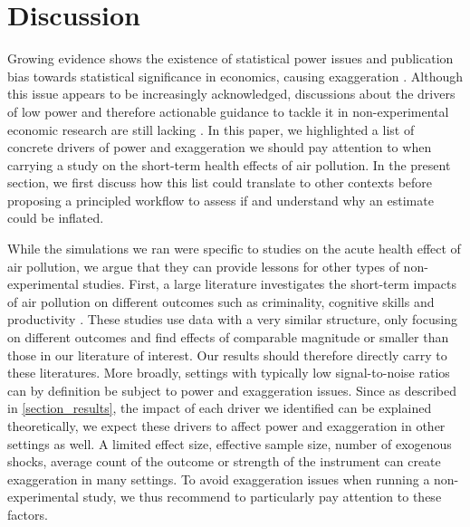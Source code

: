 \documentclass[12pt]{article}
\begin{document}

\section{Discussion}\label{section_discussion}

        \begin{sloppypar}
        Growing evidence shows the existence of statistical power issues and publication bias towards statistical significance in economics, causing exaggeration \citep{brodeur_star_2016, ioannidis_power_2017, brodeur_methods_2020, ferraro_featureis_2020}. Although this issue appears to be increasingly acknowledged, discussions about the drivers of low power and therefore actionable guidance to tackle it in non-experimental economic research are still lacking \citep{altoe_enhancing_2020, black_simulated_2022}. In this paper, we highlighted a list of concrete drivers of power and exaggeration we should pay attention to when carrying a study on the short-term health effects of air pollution. In the present section, we first discuss how this list could translate to other contexts before proposing a principled workflow to assess if and understand why an estimate could be inflated. 
        \end{sloppypar}

        While the simulations we ran were specific to studies on the acute health effect of air pollution, we argue that they can provide lessons for other types of non-experimental studies. First, a large literature investigates the short-term impacts of air pollution on different outcomes such as criminality, cognitive skills and productivity \citep[for instance]{herrnstadt_air_2021, ebenstein_long-run_2016, adhvaryu2022management}. These studies use data with a very similar structure, only focusing on different outcomes and find effects of comparable magnitude or smaller than those in our literature of interest. Our results should therefore directly carry to these literatures. More broadly, settings with typically low signal-to-noise ratios can by definition be subject to power and exaggeration issues. Since as described in \cref{section_results}, the impact of each driver we identified can be explained theoretically, we expect these drivers to affect power and exaggeration in other settings as well. A limited effect size, effective sample size, number of exogenous shocks, average count of the outcome or strength of the instrument can create exaggeration in many settings. To avoid exaggeration issues when running a non-experimental study, we thus recommend to particularly pay attention to these factors.
        
\end{document}

